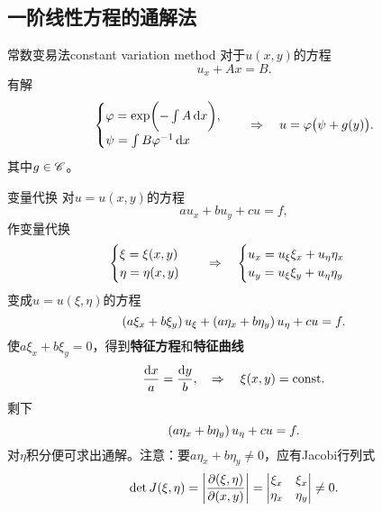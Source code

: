 \subsection{一阶线性方程的通解法}
\begin{method}{常数变易法}{constant variation method}
	对于$u(x,y)$的方程
	\[
		u_x+Ax=B.
	\]
	有解
	\begin{align*}
		\begin{cases}
			\varphi=\exp\biggl(-\int A\mathop{}\!\mathrm{d} x\biggr),  \\
			\psi=\int B\varphi^{-1}\mathop{}\!\mathrm{d} x
		\end{cases}
		\quad\Rightarrow\quad u=\varphi\bigl(\psi+g(y)\bigr).
	\end{align*}
	其中$g\in\mathscr C$。
\end{method}
\begin{method}{变量代换}
	对$u=u(x,y)$的方程
	\[
		au_x+bu_y+cu=f,
	\]
	作变量代换
	\begin{align*}
		\begin{cases}
			\xi=\xi(x,y)  \\
			\eta=\eta(x,y)
		\end{cases}
		\quad\Rightarrow\quad
		\begin{cases}
			u_x=u_\xi\xi_x+u_\eta\eta_x \\
			u_y=u_\xi\xi_y+u_\eta\eta_y
		\end{cases}
	\end{align*}
	变成$u=u(\xi,\eta)$的方程
	\[
		\left(a\xi_x+b\xi_y\right)u_\xi+\left(a\eta_x+b\eta_y\right)u_\eta+cu=f.
	\]
	使$a\xi_x+b\xi_y=0$，得到\textbf{特征方程}和\textbf{特征曲线}
	\begin{align}
		\frac{\mathop{}\!\mathrm{d} x}a=\frac{\mathop{}\!\mathrm{d} y}b,\quad\Rightarrow\quad\xi(x,y)=\mathrm{const}.
	\end{align}
	剩下
	\[
		\left(a\eta_x+b\eta_y\right)u_\eta+cu=f.
	\]
	对$\eta$积分便可求出通解。注意：要$a\eta_x+b\eta_y\neq 0$，应有Jacobi行列式
	\begin{align*}
		\det J(\xi,\eta)=\left\lvert\frac{\partial(\xi,\eta)}{\partial(x,y)}\right\rvert=
		\begin{vmatrix}
			\xi_x  & \xi_x  \\
			\eta_x & \eta_y
		\end{vmatrix}\neq 0.
	\end{align*}
\end{method}
